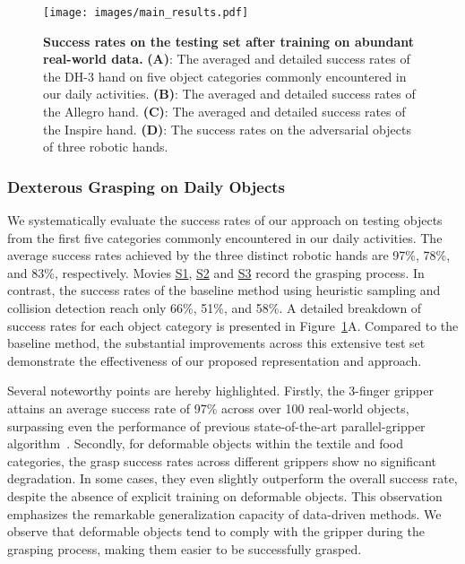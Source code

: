 \begin{figure}[t]
    \centering
    \texttt{[image: images/main\_results.pdf]}
    \caption{\textbf{Success rates on the testing set after training on abundant real-world data.} \textbf{(A)}: The averaged and detailed success rates of the DH-3 hand on five object categories commonly encountered in our daily activities. \textbf{(B)}: The averaged and detailed success rates of the Allegro hand. \textbf{(C)}: The averaged and detailed success rates of the Inspire hand. \textbf{(D)}: The success rates on the adversarial objects of three robotic hands.}
    \label{fig:main}
\end{figure}

\subsubsection*{Dexterous Grasping on Daily Objects}

We systematically evaluate the success rates of our approach on testing objects from the first five categories commonly encountered in our daily activities. The average success rates achieved by the three distinct robotic hands are 97\%, 78\%, and 83\%, respectively. Movies \hyperlink{movie_s1}{S1}, \hyperlink{movie_s2}{S2} and \hyperlink{movie_s3}{S3} record the grasping process. In contrast, the success rates of the baseline method using heuristic sampling and collision detection reach only 66\%, 51\%, and 58\%. A detailed breakdown of success rates for each object category is presented in Figure~\ref{fig:main}A. Compared to the baseline method, the substantial improvements across this extensive test set demonstrate the effectiveness of our proposed representation and approach.

Several noteworthy points are hereby highlighted. Firstly, the 3-finger gripper attains an average success rate of 97\% across over 100 real-world objects, surpassing even the performance of previous state-of-the-art parallel-gripper algorithm~\cite{fang2023anygrasp}. Secondly, for deformable objects within the textile and food categories, the grasp success rates across different grippers show no significant degradation. In some cases, they even slightly outperform the overall success rate, despite the absence of explicit training on deformable objects. This observation emphasizes the remarkable generalization capacity of data-driven methods. We observe that deformable objects tend to comply with the gripper during the grasping process, making them easier to be successfully grasped.

